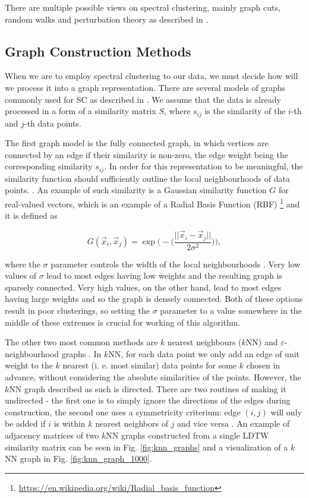 There are multiple possible views on spectral clustering, mainly graph cuts, random walks and perturbation theory  as described in \cite{von2007tutorial}.

\subsection{Graph Construction Methods}
When we are to employ spectral clustering to our data, we must decide how will we process it into a graph representation. There are several models of graphs commonly used for SC as described in \cite{von2007tutorial}. We assume that the data is already processed in a form of a similarity matrix $S$, where $s_{ij}$ is the similarity of the $i$-th and $j$-th data points.

The first graph model is the fully connected graph, in which vertices are connected by an edge if their similarity is non-zero, the edge weight being the corresponding similarity $s_{ij}$. In order for this representation to be meaningful, the similarity function should sufficiently outline the local neighbourhoods of data points. \cite{von2007tutorial}. An example of such similarity is a Gaussian similarity function $G$ for real-valued vectors, which is an example of a Radial Basis Function (RBF) \footnote{\url{https://en.wikipedia.org/wiki/Radial_basis_function}} and it is defined as

\begin{equation}
    G(\vec{x}_i, \vec{x}_j) = \exp{\Bigg( - \Bigg( \frac{||\vec{x}_i - \vec{x}_j||}{2\sigma^2} \Bigg) \Bigg) },
\end{equation}

where the $\sigma$ parameter controls the width of the local neighbourhoods \cite{von2007tutorial}. Very low values of $\sigma$ lead to most edges having low weights and the resulting graph is sparsely connected. Very high values, on the other hand, lead to most edges having large weights and so the graph is densely connected. Both of these options result in poor clusterings, so setting the $\sigma$ parameter to a value somewhere in the middle of these extremes is crucial for working of this algorithm.

The other two most common methods are $k$ nearest neighbours ($k$NN) and $\varepsilon$-neighbourhood graphs \cite{von2007tutorial}. In $k$NN, for each data point we only add an edge of unit weight to the $k$ nearest (i. e. most similar) data points for some $k$ chosen in advance, without considering the absolute similarities of the points. However, the $k$NN graph described as such is directed. There are two routines  of making it undirected - the first one is to simply ignore the directions of the edges during construction, the second one uses a symmetricity criterium: edge $(i, j)$ will only be added if $i$ is within $k$ nearest neighbors of $j$ and vice versa \cite{von2007tutorial}. An example of adjacency matrices of two $k$NN graphs constructed from a single LDTW similarity matrix can be seen in Fig. \ref{fig:knn_graphs} and a visualization of a $k$NN graph in Fig. \ref{fig:knn_graph_1000}.


